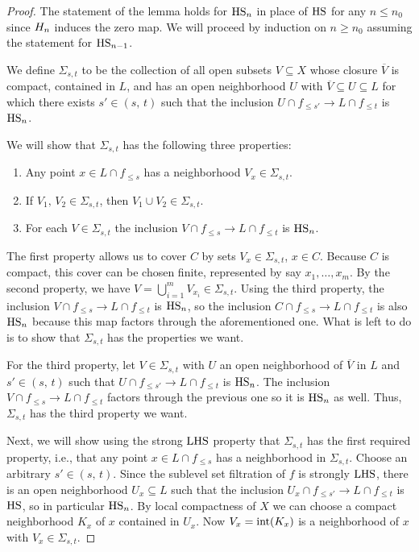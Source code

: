 \begin{proof}
    The statement of the lemma holds for $\mathrm{HS}_{n}$ in place of $\mathrm{HS}$ for any $n \leq n_0$ since $H_{n}$ induces the zero map.
    We will proceed by induction on $n \geq n_0$ assuming the statement for $\mathrm{HS}_{n-1}$.

    We define $\Sigma_{s, t}$ to be the collection of all open subsets $V \subseteq X$ whose closure $\overline{V}$ is compact, contained in $L$, and has an open neighborhood $U$ with 
	$\overline{V} \subseteq U \subseteq L$
	for which there exists $s' \in (s,\, t)$ such that the inclusion
    $U \cap f_{\leq s'} \to L \cap f_{\leq t}$
	is $\mathrm{HS}_n$. 
	
	We will show that $\Sigma_{s, t}$ has the following three properties:
	\begin{enumerate}
	    \item Any point $x \in L \cap f_{\leq s}$ has a neighborhood $V_x \in \Sigma_{s,t}$.
	    \item If $V_1,\, V_2 \in \Sigma_{s,t}$, then $V_1 \cup V_2 \in \Sigma_{s,t}$.
	    \item For each $V \in \Sigma_{s,t}$ the inclusion 
	    $V \cap f_{\leq s} \to L \cap f_{\leq t}$ 
	    is $\mathrm{HS}_n$.
	\end{enumerate}
	
	The first property allows us to cover $C$ by sets $V_x \in \Sigma_{s,t}$, $x \in C$. 
	Because $C$ is compact, this cover can be chosen finite, represented by say $x_1,\dots, x_m$. 
	By the second property, we have $V = \bigcup_{i = 1}^m V_{x_i} \in \Sigma_{s,t}$.
	Using the third property, the inclusion 
	$V \cap f_{\leq s} \to L \cap f_{\leq t}$ 
	is $\mathrm{HS}_n$, so the inclusion 
	$C \cap f_{\leq s} \to L \cap f_{\leq t}$ 
	is also $\mathrm{HS}_n$ because this map factors through the aforementioned one.
	What is left to do is to show that $\Sigma_{s,t}$ has the properties we want.
	
	For the third property, let $V \in \Sigma_{s,t}$ with $U$ an open neighborhood of $\overline{V}$ in $L$ and $s' \in (s,\, t)$ such that 
	$U \cap f_{\leq s'} \to L \cap f_{\leq t}$
	is $\mathrm{HS}_n$. 
	The inclusion
	$V \cap f_{\leq s} \to L \cap f_{\leq t}$
	factors through the previous one %
	so it is $\mathrm{HS}_n$ as well. Thus, $\Sigma_{s, t}$ has the third property we want.
	
	Next, we will show using the strong $\mathrm{LHS}$ property that $\Sigma_{s, t}$ has the first required property, i.e., that any point $x \in L \cap f_{\leq s}$ has a neighborhood in $\Sigma_{s, t}$.
	Choose an arbitrary $s' \in (s,\, t)$.
	Since the sublevel set filtration of $f$ is strongly $\mathrm{LHS}$, there is an open neighborhood $U_x \subseteq L$ such that the inclusion
	$U_x \cap f_{\leq s'} \to L \cap f_{\leq t}$
	is $\mathrm{HS}$, so in particular $\mathrm{HS}_n$.
	By local compactness of $X$ we can choose a compact neighborhood $K_x$ of $x$ contained in $U_x$. 
	Now $V_x = \operatorname{int} (K_x)$ is a neighborhood of $x$ with $V_x \in \Sigma_{s,t}$.
	

\end{proof}
